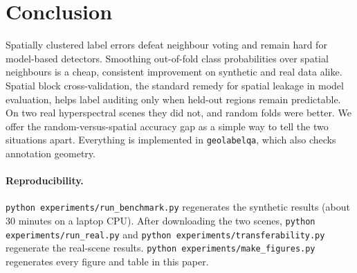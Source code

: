 \documentclass[11pt]{article}
\begin{document}
\section{Conclusion}

Spatially clustered label errors defeat neighbour voting and remain hard for
model-based detectors. Smoothing out-of-fold class probabilities over spatial
neighbours is a cheap, consistent improvement on synthetic and real data alike.
Spatial block cross-validation, the standard remedy for spatial leakage in model
evaluation, helps label auditing only when held-out regions remain predictable.
On two real hyperspectral scenes they did not, and random folds were better. We
offer the random-versus-spatial accuracy gap as a simple way to tell the two
situations apart. Everything is implemented in \texttt{geolabelqa}, which also
checks annotation geometry.

\paragraph{Reproducibility.}
\texttt{python experiments/run\_benchmark.py} regenerates the synthetic results
(about 30 minutes on a laptop CPU). After downloading the two scenes,
\texttt{python experiments/run\_real.py} and
\texttt{python experiments/transferability.py} regenerate the real-scene results.
\texttt{python experiments/make\_figures.py} regenerates every figure and table
in this paper.



\end{document}
